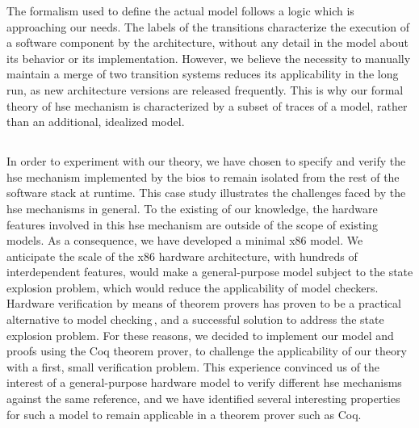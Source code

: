 %
The formalism used to define the actual model follows a logic which is
approaching our needs.
%
The labels of the transitions characterize the execution of a software component
by the architecture, without any detail in the model about its behavior or its
implementation.
%
However, we believe the necessity to manually maintain a merge of two transition
systems reduces its applicability in the long run, as new architecture versions
are released frequently.
%
This is why our formal theory of \ac{hse} mechanism is characterized by a subset
of traces of a model, rather than an additional, idealized model.
%

\subsection*{}

In order to experiment with our theory, we have chosen to specify and verify the
\ac{hse} mechanism implemented by the \ac{bios} to remain isolated from the rest
of the software stack at runtime.
%
This case study illustrates the challenges faced by the \ac{hse} mechanisms in
general.
%
To the existing of our knowledge, the hardware features involved in this
\ac{hse} mechanism are outside of the scope of existing models.
%
As a consequence, we have developed a minimal x86 model.
%
We anticipate the scale of the x86 hardware architecture, with hundreds of
interdependent features, would make a general-purpose model subject to the state
explosion problem, which would reduce the applicability of model checkers.
%
Hardware verification by means of theorem provers has proven to be a practical
alternative to model checking\,\cite{vijayaraghavan2015modular,choi2017kami},
and a successful solution to address the state explosion problem.
%
For these reasons, we decided to implement our model and proofs using the Coq
theorem prover, to challenge the applicability of our theory with a first, small
verification problem.
%
This experience convinced us of the interest of a general-purpose hardware model
to verify different \ac{hse} mechanisms against the same reference, and we have
identified several interesting properties for such a model to remain applicable
in a theorem prover such as Coq.

